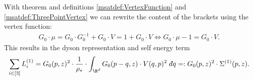 With theorem and definitions \ref{msatdef:VertexFunction} and \ref{msatdef:ThreePointVertex} we can rewrite the content of the brackets using the vertex function:
\begin{align}
    G_0\cdot\mu = G_0\cdot G_0^{-1} + G_0\cdot V = 1 + G_0\cdot V \iff G_0\cdot \mu - 1 = G_0\cdot V.\label{eq:OneLoopCalcIntegralDiag-Vertex}
\end{align}
This results in the dyson representation and self energy term
\[
    \sum_{i\in[3]}L^{(1)}_i = G_0(p,z)^2\cdot\frac{1}{\rho_*}\cdot\int_{\R^d}G_0(p-q,z)\cdot V(q,p)^2\;\dbar q =: G_0(p,z)^2\cdot\Sigma^{(1)}(p,z).
\]